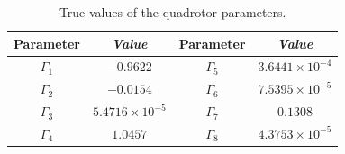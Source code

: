 \documentclass[3p,times]{elsarticle}
\newcommand\Tstrut{\rule{0pt}{2.6ex}}         %
\begin{document}
\begin{table}[H]
	\renewcommand{\arraystretch}{1.3}
	\caption{True values of the quadrotor parameters.}
	\begin{center}
	\begin{tabular}{c c c c}
	\hline
	\textbf{Parameter} & \textbf{\textit{Value}}& \textbf{Parameter} & \textbf{\textit{Value}}  \\
	\hline
	$\Gamma_1$ & $-0.9622$ & $\Gamma_5$ & $3.6441\times10^{-4}$ \\

	$\Gamma_2$ & $-0.0154$ & $\Gamma_6$ & $7.5395\times10^{-5}$ \\

	$\Gamma_3$ &$5.4716\times10^{-5}$ & $\Gamma_7$ & $0.1308$ \\

	$\Gamma_4$ & $1.0457$ & $\Gamma_8$ & $4.3753\times10^{-5}$ \\
	\hline
	\end{tabular}
	\label{tab:true_parameters}
	\end{center}
\end{table}


\end{document}
